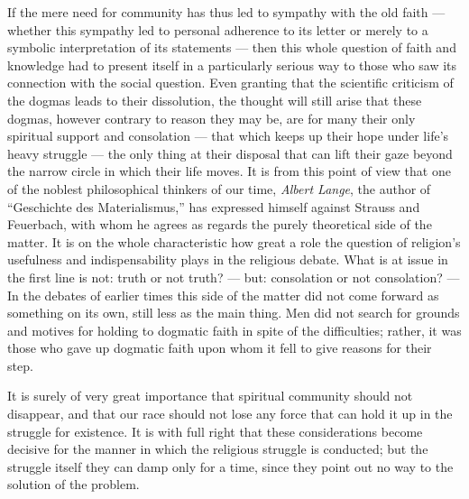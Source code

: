 \documentclass[12pt,a4paper,openany]{book}
\newcommand{\opage}[1]{\marginnote{\footnotesize\textit{[#1]}}}
\begin{document}
If the mere need for community has thus led to sympathy with the old faith ---
whether this sympathy
\opage{208}led to personal adherence to its letter or merely to a
symbolic interpretation of its statements --- then this whole question of
faith and knowledge had to present itself in a particularly serious way to
those who saw its connection with the social question. Even granting that the
scientific criticism of the dogmas leads to their dissolution, the thought will
still arise that these dogmas, however contrary to reason they may be, are for
many their only spiritual support and consolation --- that which keeps up
their hope under life's heavy struggle --- the only thing at their disposal
that can lift their gaze beyond the narrow circle in which their life moves.
It is from this point of view that one of the noblest philosophical thinkers of
our time, \emph{Albert Lange}, the author of ``Geschichte des Materialismus,'' has
expressed himself against Strauss and Feuerbach, with whom he agrees as
regards the purely theoretical side of the matter. It is on the whole
characteristic how great a role the question of religion's usefulness and
indispensability plays in the religious debate. What is at issue in the first
line is not: truth or not truth? --- but: consolation or not consolation? ---
In the debates of earlier times this side of the matter did not come forward
as something on its own, still less as the main thing. Men did not search for
grounds and motives for holding to dogmatic faith in spite of the
difficulties; rather, it was those who gave up dogmatic faith upon whom it fell
to give reasons for their step.

It is surely of very great importance that spiritual community should not
disappear, and that our race should not lose any force that can hold it up in
the struggle for existence. It is with full right that these considerations
become decisive for the manner in which the religious struggle is conducted;
but the struggle itself they can damp only for a time, since they point out no
way to the solution of the problem.
\end{document}
